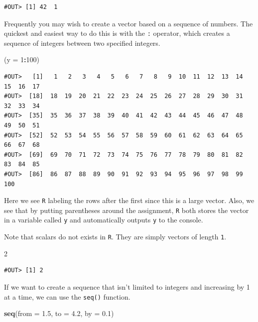 \documentclass[]{book}
\newenvironment{Shaded}{\begin{snugshade}}{\end{snugshade}}
\newcommand{\KeywordTok}[1]{\textcolor[rgb]{0.13,0.29,0.53}{\textbf{#1}}}
\newcommand{\DataTypeTok}[1]{\textcolor[rgb]{0.13,0.29,0.53}{#1}}
\newcommand{\DecValTok}[1]{\textcolor[rgb]{0.00,0.00,0.81}{#1}}
\newcommand{\FloatTok}[1]{\textcolor[rgb]{0.00,0.00,0.81}{#1}}
\newcommand{\OperatorTok}[1]{\textcolor[rgb]{0.81,0.36,0.00}{\textbf{#1}}}
\newcommand{\NormalTok}[1]{#1}
\theoremstyle{definition}
\theoremstyle{definition}
\theoremstyle{definition}
\theoremstyle{remark}
\begin{document}
\begin{verbatim}
#OUT> [1] 42  1
\end{verbatim}

Frequently you may wish to create a vector based on a sequence of
numbers. The quickest and easiest way to do this is with the \texttt{:}
operator, which creates a sequence of integers between two specified
integers.

\begin{Shaded}
\begin{Highlighting}[]
\NormalTok{(}\DataTypeTok{y =} \DecValTok{1}\OperatorTok{:}\DecValTok{100}\NormalTok{)}
\end{Highlighting}
\end{Shaded}

\begin{verbatim}
#OUT>   [1]   1   2   3   4   5   6   7   8   9  10  11  12  13  14  15  16  17
#OUT>  [18]  18  19  20  21  22  23  24  25  26  27  28  29  30  31  32  33  34
#OUT>  [35]  35  36  37  38  39  40  41  42  43  44  45  46  47  48  49  50  51
#OUT>  [52]  52  53  54  55  56  57  58  59  60  61  62  63  64  65  66  67  68
#OUT>  [69]  69  70  71  72  73  74  75  76  77  78  79  80  81  82  83  84  85
#OUT>  [86]  86  87  88  89  90  91  92  93  94  95  96  97  98  99 100
\end{verbatim}

Here we see \texttt{R} labeling the rows after the first since this is a
large vector. Also, we see that by putting parentheses around the
assignment, \texttt{R} both stores the vector in a variable called
\texttt{y} and automatically outputs \texttt{y} to the console.

Note that scalars do not exists in \texttt{R}. They are simply vectors
of length \texttt{1}.

\begin{Shaded}
\begin{Highlighting}[]
\DecValTok{2}
\end{Highlighting}
\end{Shaded}

\begin{verbatim}
#OUT> [1] 2
\end{verbatim}

If we want to create a sequence that isn't limited to integers and
increasing by 1 at a time, we can use the \texttt{seq()} function.

\begin{Shaded}
\begin{Highlighting}[]
\KeywordTok{seq}\NormalTok{(}\DataTypeTok{from =} \FloatTok{1.5}\NormalTok{, }\DataTypeTok{to =} \FloatTok{4.2}\NormalTok{, }\DataTypeTok{by =} \FloatTok{0.1}\NormalTok{)}
\end{Highlighting}
\end{Shaded}
\end{document}
